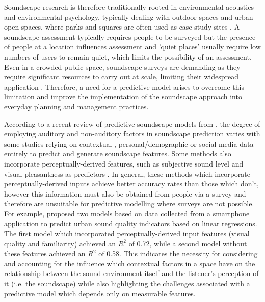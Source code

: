  Soundscape research is therefore traditionally rooted in environmental acoustics and environmental psychology, typically dealing with outdoor spaces \citep{Torresin2020Indoor} and urban open spaces, where parks and squares are often used as case study sites \citep{Kang2007Urban}. A soundscape assessment typically requires people to be surveyed but the presence of people at a location influences assessment \citep{Aletta2018Towards} and 'quiet places' usually require low numbers of users to remain quiet, which limits the possibility of an assessment. Even in a crowded public space, soundscape surveys are demanding as they require significant resources to carry out at scale, limiting their widespread application \citep{Mitchell2020Soundscape}. Therefore, a need for a predictive model arises to overcome this limitation and improve the implementation of the soundscape approach into everyday planning and management practices.

 According to a recent review of predictive soundscape models from \citet{Lionello2020systematic}, the degree of employing auditory and non-auditory factors in soundscape prediction varies with some studies relying on contextual \citep{Kajihara2017Imaginary}, personal/demographic \citep{Erfanian2021Psychological,Tarlao2020Investigating} or social media \citep{Aiello2016Chatty} data entirely to predict and generate soundscape features. Some methods also incorporate perceptually-derived features, such as subjective sound level and visual pleasantness as predictors \citep{Lionello2020systematic}. In general, these methods which incorporate perceptually-derived inputs achieve better accuracy rates than those which don't, however this information must also be obtained from people via a survey and therefore are unsuitable for predictive modelling where surveys are not possible. For example, \citet{Ricciardi2015Sound} proposed two models based on data collected from a smartphone application to predict urban sound quality indicators based on linear regressions. The first model which incorporated perceptually-derived input features (visual quality and familiarity) achieved an $R^2$ of 0.72, while a second model without these features achieved an $R^2$ of 0.58. This indicates the necessity for considering and accounting for the influence which contextual factors in a space have on the relationship between the sound environment itself and the listener's perception of it (i.e. the soundscape) while also highlighting the challenges associated with a predictive model which depends only on measurable features.

